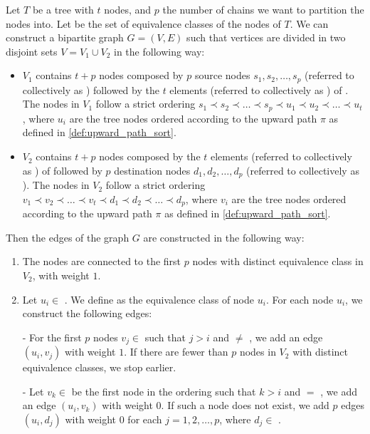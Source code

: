 \begin{definition} \label{def:bip_construction}
    Let $T$ be a tree with $t$ nodes, and $p$ the number of chains we want to partition the nodes into. Let \equivsetmath be the set of equivalence classes of the nodes of $T$. We can construct a bipartite graph $G = (V, E)$ such that vertices are divided in two disjoint sets $V = V_1 \cup V_2$ in the following way:
    \begin{itemize}
        \item $V_1$ contains $t + p$ nodes composed by $p$ source nodes $s_1, s_2, \dots, s_p$ (referred to collectively as \sourceset) followed by the $t$ elements (referred to collectively as ) of \equivsetmath. The nodes in $V_1$ follow a strict ordering $s_1 \prec s_2 \prec \dots \prec s_p \prec u_1 \prec u_2 \prec \dots \prec u_t$, where $u_i$ are the tree nodes ordered according to the upward path $\pi$ as defined in \cref{def:upward_path_sort}. 
        \item $V_2$ contains $t + p$ nodes composed by the $t$ elements (referred to collectively as ) of \equivsetmath followed by $p$ destination nodes $d_1, d_2, \dots, d_p$ (referred to collectively as \destset). The nodes in $V_2$ follow a strict ordering $v_1 \prec v_2 \prec \dots \prec v_t \prec d_1 \prec d_2 \prec \dots \prec d_p$, where $v_i$ are the tree nodes ordered according to the upward path $\pi$ as defined in \cref{def:upward_path_sort}.
    \end{itemize}

    Then the edges of the graph $G$ are constructed in the following way:
    \begin{enumerate}
        \item The \sourceset nodes are connected to the first $p$ nodes with distinct equivalence class in $V_2$, with weight $1$.
        \item Let $u_i \in$ . We define  as the equivalence class of node $u_i$. For each node $u_i$, we construct the following edges:
        
        - For the first $p$ nodes $v_j \in$  such that $j > i$ and  $\neq$ , we add an edge $(u_i, v_j)$ with weight $1$. If there are fewer than $p$ nodes in $V_2$ with distinct equivalence classes, we stop earlier.

        - Let $v_k \in$  be the first node in the ordering such that $k > i$ and  $=$ , we add an edge $(u_i, v_k)$ with weight $0$. If such a node does not exist, we add $p$ edges $(u_i, d_j)$ with weight $0$ for each $j = 1, 2, \ldots, p$, where $d_j \in$ \destset.
    \end{enumerate}
\end{definition}

